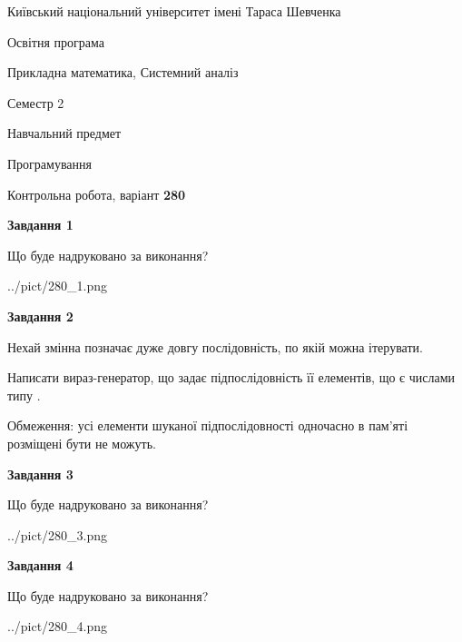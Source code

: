 \documentclass[12pt, ukrainian]{article}
\begin{document}
{{\begin {small}\par
{ \center  Київський національний університет імені Тараса Шевченка \par}
{\parbox {5 cm}{Освітня програма \hfill}{\parbox {8 cm}{Прикладна математика, Системний аналіз \hfill}}\parbox {5 cm}{\hfill Семестр 2}}\par
{\parbox {5 cm} {Навчальний предмет \hfill}\parbox {7 cm}{Програмування \hfill}\parbox {6cm}{\hfill}\par}\vspace{-7pt} \end{small}}{\center Контрольна робота, варіант  \No \textbf
{ 280 }\par}}
{
\begin {large}
{\begin {center}\textbf{Завдання 1}\end {center}}\par
Що буде надруковано за виконання?\par\par
\begin{center}
	{../pict/280_1.png}
\end{center}
\newpage

{\begin {center}\textbf{Завдання 2}\end {center}}\par
Нехай змінна  позначає дуже довгу послідовність, по якій можна ітерувати.

Написати вираз-генератор, що задає підпослідовність її елементів, що є числами типу .

Обмеження: усі елементи шуканої підпослідовності одночасно в пам'яті розміщені бути не можуть.\par
\newpage

{\begin {center}\textbf{Завдання 3}\end {center}}\par
Що буде надруковано за виконання?
\begin{center}
	{../pict/280_3.png}
\end{center}
\newpage

{\begin {center}\textbf{Завдання 4}\end {center}}\par
Що буде надруковано за виконання?\par
\begin{center}
	{../pict/280_4.png}
\end{center}
\newpage


\end{large}}
\end{document}
